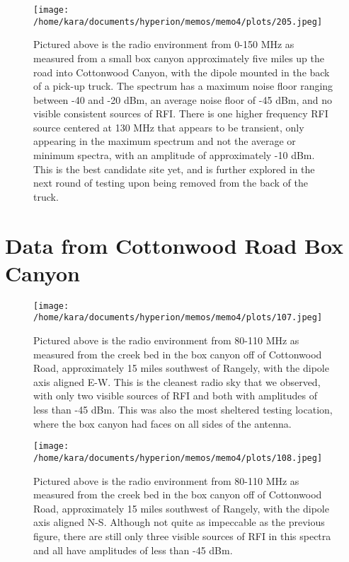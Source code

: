 \documentclass[11pt]{article}
\begin{document}
\begin{figure}[H]
    \begin{center}
    \texttt{[image: /home/kara/documents/hyperion/memos/memo4/plots/205.jpeg]}
    \end{center}
    \caption{
        Pictured above is the radio environment from 0-150 MHz as measured from 
        a small box canyon approximately five miles up the road into Cottonwood 
        Canyon, with the dipole mounted in the back of a pick-up truck.  The 
        spectrum has a maximum noise floor ranging between -40 and -20 dBm, an 
        average noise floor of -45 dBm, and no visible consistent sources of 
        RFI.  There is one higher frequency RFI source centered at 130 MHz that 
        appears to be transient, only appearing in the maximum spectrum and not 
        the average or minimum spectra, with an amplitude of approximately -10 
        dBm.  This is the best candidate site yet, and is further explored in 
        the next round of testing upon being removed from the back of the 
        truck.
    }
    \label{fig:205}
\end{figure}

\section{Data from Cottonwood Road Box Canyon}

\begin{figure}[H]
    \begin{center}
    \texttt{[image: /home/kara/documents/hyperion/memos/memo4/plots/107.jpeg]}
    \end{center}
    \caption{
        Pictured above is the radio environment from 80-110 MHz as measured 
        from the creek bed in the box canyon off of Cottonwood Road, 
        approximately 15 miles southwest of Rangely, with the dipole axis 
        aligned E-W.  This is the cleanest radio sky that we observed, with 
        only two visible sources of RFI and both with amplitudes of less than 
        -45 dBm.  This was also the most sheltered testing location, where the 
        box canyon had faces on all sides of the antenna.
    }
    \label{fig:107}
\end{figure}

\begin{figure}[H]
    \begin{center}
    \texttt{[image: /home/kara/documents/hyperion/memos/memo4/plots/108.jpeg]}
    \end{center}
    \caption{
        Pictured above is the radio environment from 80-110 MHz as measured 
        from the creek bed in the box canyon off of Cottonwood Road, 
        approximately 15 miles southwest of Rangely, with the dipole axis 
        aligned N-S.  Although not quite as impeccable as the previous figure, 
        there are still only three visible sources of RFI in this spectra and 
        all have amplitudes of less than -45 dBm.
    }
    \label{fig:108}
\end{figure}
\end{document}
